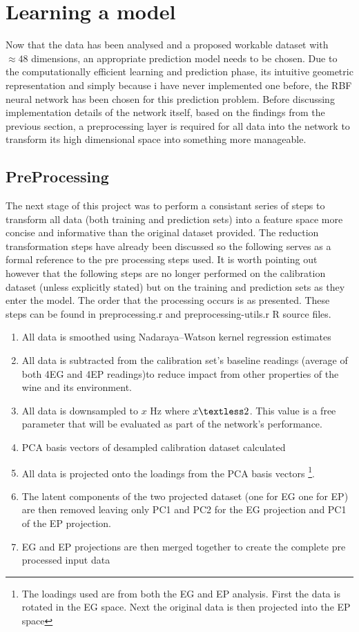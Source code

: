 \documentclass[twocolumn]{article}
\begin{document}
\section{Learning a model}
Now that the data has been analysed and a proposed workable dataset with $\approx48$ dimensions, an appropriate prediction model needs to be chosen.
Due to the computationally efficient learning and prediction phase, its intuitive geometric representation and simply because i have never
implemented one before, the RBF neural network has been chosen for this prediction problem. Before discussing implementation details
of the network itself, based on the findings from the previous section, a preprocessing layer is required for all data into the network
to transform its high dimensional space into something more manageable. 
\subsection{PreProcessing}
The next stage of this project was to perform a consistant series of steps to transform all data (both training and prediction sets) into a
feature space more concise and informative than the original dataset provided. The reduction transformation steps have already been discussed so the 
following serves as a formal reference to the pre processing steps used. It is worth pointing out however that the following steps are no longer 
performed on the calibration dataset (unless explicitly stated) but on the training and prediction sets as they enter the model. The order that the 
processing occurs is as presented. These steps can be found in preprocessing.r and preprocessing-utils.r R source files.

\begin{enumerate}
	\item All data is smoothed using Nadaraya–Watson kernel regression estimates
	\item All data is subtracted from the calibration set's baseline readings (average of both 4EG and 4EP readings)to reduce impact from 
		  other properties of the wine and its environment.
	\item All data is downsampled to $x$ Hz where $x \textless 2$. This value is a free parameter that will be evaluated as part of the network's performance.
	\item PCA basis vectors of desampled calibration dataset calculated 
	\item All data is projected onto the loadings from the PCA basis vectors \footnote{The loadings used are from both the EG and EP analysis. First the
		  data is rotated in the EG space. Next the original data is then projected into the EP space}.
	\item The latent components of the two projected dataset (one for EG one for EP) are then removed leaving only PC1 and PC2 for the EG projection
		  and PC1 of the EP projection.
	\item EG and EP projections are then merged together to create the complete pre processed input data
	
\end{enumerate}
\end{document}
